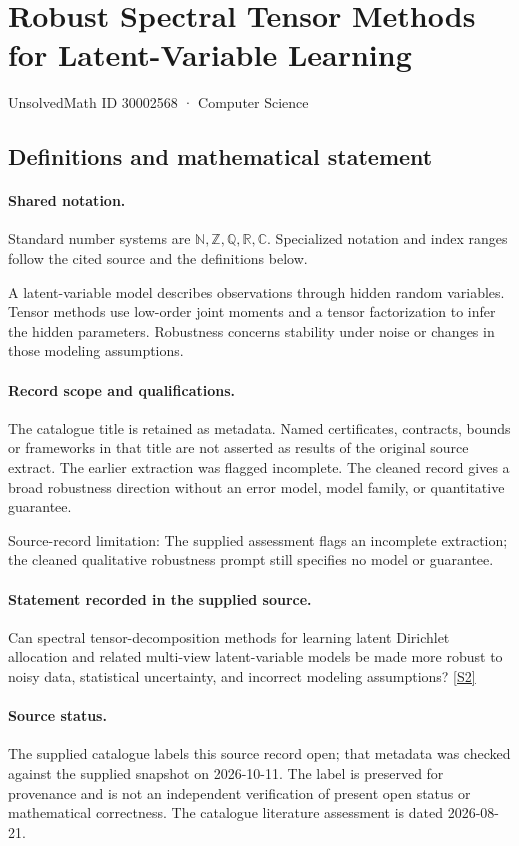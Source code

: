 \documentclass[11pt]{article}
\newcommand{\sref}[2]{\hyperlink{source:#1:#2}{[S#2]}}
\begin{document}
\setcounter{section}{30002567}
\section{Robust Spectral Tensor Methods for Latent-Variable Learning}\label{30002568}
{\small\sffamily UnsolvedMath ID 30002568 · Computer Science}
\subsection{Definitions and mathematical statement}

\paragraph{Shared notation.}Standard number systems are $\mathbb N,\mathbb Z,\mathbb Q,\mathbb R,\mathbb C$. Specialized notation and index ranges follow the cited source and the definitions below.


A latent-variable model describes observations through hidden random variables. Tensor methods use low-order joint moments and a tensor factorization to infer the hidden parameters. Robustness concerns stability under noise or changes in those modeling assumptions.
\paragraph{Record scope and qualifications.}
The catalogue title is retained as metadata. Named certificates, contracts, bounds or frameworks in that title are not asserted as results of the original source extract.
The earlier extraction was flagged incomplete. The cleaned record gives a broad robustness direction without an error model, model family, or quantitative guarantee.

Source-record limitation: The supplied assessment flags an incomplete extraction; the cleaned qualitative robustness prompt still specifies no model or guarantee.
\paragraph{Statement recorded in the supplied source.}
Can spectral tensor-decomposition methods for learning latent Dirichlet allocation and related multi-view latent-variable models be made more robust to noisy data, statistical uncertainty, and incorrect modeling assumptions? \sref{30002568}{2}
\paragraph{Source status.}
The supplied catalogue labels this source record open; that metadata was checked against the supplied snapshot on 2026-10-11. The label is preserved for provenance and is not an independent verification of present open status or mathematical correctness. The catalogue literature assessment is dated 2026-08-21.
\end{document}
